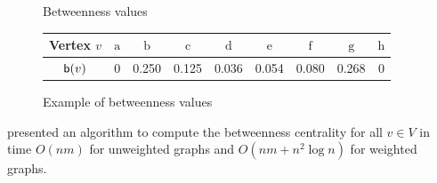 \begin{figure}[ht]
  
  \begin{subtable}[c]{0.7\textwidth}
  \centering
    \caption{Betweenness values}
    \begin{tabular}{ccccccccc}
      \toprule
      Vertex  $v$& $\mathrm{a}$ & $\mathrm{b}$ &$\mathrm{c}$ &$\mathrm{d}$ &$\mathrm{e}$ &$\mathrm{f}$ &$\mathrm{g}$ &$\mathrm{h}$ \\
      \midrule
      $\mathsf{b}(v)$ & 0 & 0.250 & 0.125 & 0.036 & 0.054 & 0.080 & 0.268 & 0 \\
      \bottomrule
    \end{tabular}
  \end{subtable}
  \caption{Example of betweenness values}
  \label{fig:example-betw}
\end{figure}
\fi

\citet{Brandes01} presented an
algorithm to compute the betweenness centrality for all $v\in V$ in time
$O(nm)$ for unweighted graphs and $O(nm + n^2 \log n)$ for weighted graphs. 

